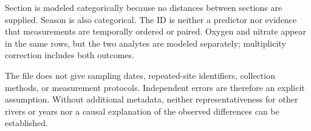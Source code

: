 Section is modeled categorically because no distances between sections are supplied. Season is also categorical. The ID is neither a predictor nor evidence that measurements are temporally ordered or paired. Oxygen and nitrate appear in the same rows, but the two analytes are modeled separately; multiplicity correction includes both outcomes.

The file does not give sampling dates, repeated-site identifiers, collection methods, or measurement protocols. Independent errors are therefore an explicit assumption. Without additional metadata, neither representativeness for other rivers or years nor a causal explanation of the observed differences can be established.
